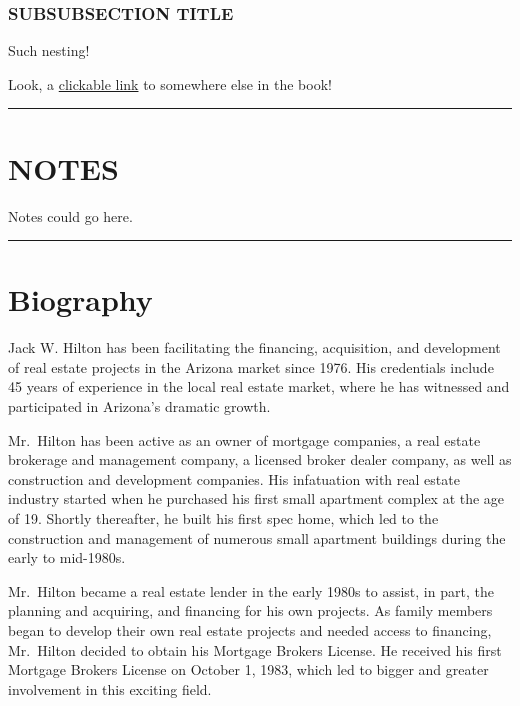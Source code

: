 \documentclass[
]{book}
\begin{document}
\hypertarget{subsubsection-title-1}{%
\subsection*{SUBSUBSECTION TITLE}\label{subsubsection-title-1}}


Such nesting!

Look, a \protect\hyperlink{picturetemplate}{clickable link} to somewhere else in the book!

\begin{center}\rule{0.5\linewidth}{0.5pt}\end{center}

\hypertarget{notes-1}{%
\chapter*{NOTES}\label{notes-1}}


Notes could go here.

\begin{center}\rule{0.5\linewidth}{0.5pt}\end{center}

\hypertarget{bio}{%
\chapter*{Biography}\label{bio}}


Jack W. Hilton has been facilitating the financing, acquisition, and development of real estate projects
in the Arizona market since 1976.
His credentials include 45 years of experience in the local real estate market,
where he has witnessed and participated in Arizona's dramatic growth.

Mr.~Hilton has been active as an owner of mortgage companies,
a real estate brokerage and management company,
a licensed broker dealer company,
as well as construction and development companies.
His infatuation with real estate industry started
when he purchased his first small apartment complex at the age of 19.
Shortly thereafter, he built his first spec home,
which led to the construction and management of numerous small apartment buildings during the early to mid-1980s.

Mr.~Hilton became a real estate lender in the early 1980s to assist, in part,
the planning and acquiring, and financing for his own projects.
As family members began to develop their own real estate projects and needed access to financing,
Mr.~Hilton decided to obtain his Mortgage Brokers License.
He received his first Mortgage Brokers License on October 1, 1983,
which led to bigger and greater involvement in this exciting field.
\end{document}
